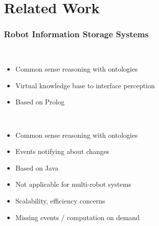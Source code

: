 \section{Related Work}
\begin{frame}
  \frametitle{Robot Information Storage Systems}
  \begin{description}[]
  \item[KnowRob~\cite{KnowRob}]%
    \hfill \\
    \begin{itemize}
    \item Common sense reasoning with ontologies
    \item Virtual knowledge base to interface perception
    \item Based on Prolog
    \end{itemize}
  \end{description}
  \begin{description}[]
  \item[OpenRobots Ontology~\cite{Oro}]%
    \hfill \\
    \begin{itemize}
    \item Common sense reasoning with ontologies
    \item Events notifying about changes
    \item Based on  Java
    \end{itemize}
  \end{description}
  \begin{block}{}%
  \begin{itemize}
  \item Not applicable for multi-robot systems
  \item Scalability, efficiency concerns %
  \item Missing events / computation on demand
  \end{itemize}
  \end{block}
\end{frame}

